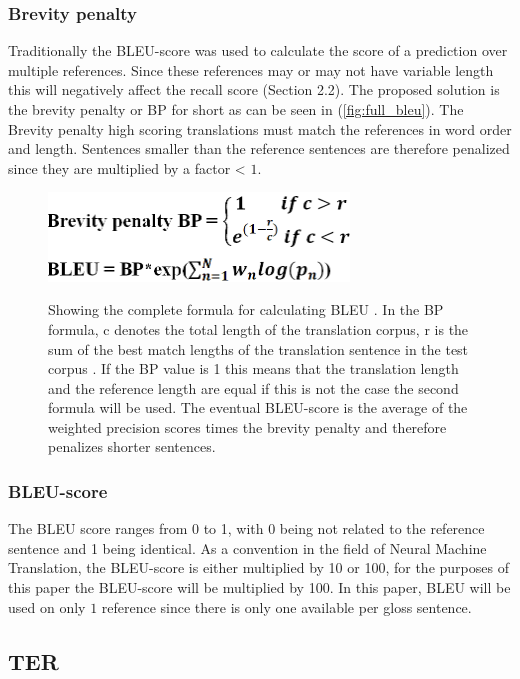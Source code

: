 \subsubsection{Brevity penalty}
Traditionally the BLEU-score was used to calculate the score of a prediction over multiple references. Since these references may or may not have variable length this will negatively affect the recall score \cite{papineni2002bleu} (Section 2.2). The proposed solution is the brevity penalty or BP for short as can be seen in (\autoref{fig:full_bleu}). The Brevity penalty high scoring translations must match the references in word order and length. Sentences smaller than the reference sentences are therefore penalized since they are multiplied by a factor < $1$. 


\begin{figure}[h]
 \caption{Showing the complete formula for calculating BLEU \cite{papineni2002bleu}. In the BP formula, c denotes the total length of the translation corpus, r is the sum of the best match lengths of the translation sentence in the test corpus \cite{papineni2002bleu}. If the BP value is 1 this means that the translation length and the reference length are equal if this is not the case the second formula will be used. The eventual BLEU-score is the average of the weighted precision scores times the brevity penalty and therefore penalizes shorter sentences. }
 \centering 
 \includegraphics[width=8cm]{Bachelor CSAI thesis template/images/bleu_formula.PNG}
 \label{fig:full_bleu}
\end{figure}

\subsubsection{BLEU-score}

The BLEU score ranges from 0 to 1, with 0 being not related to the reference sentence and 1 being identical. As a convention in the field of Neural Machine Translation, the BLEU-score is either multiplied by 10 or 100, for the purposes of this paper the BLEU-score will be multiplied by 100. In this paper, BLEU will be used on only $1$ reference since there is only one available per gloss sentence.

\subsection{TER}

